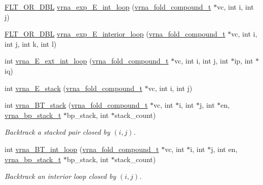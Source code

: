 \begin{DoxyCompactItemize}
\mbox{\hyperlink{group__data__structures_ga31125aeace516926bf7f251f759b6126}{F\+L\+T\+\_\+\+O\+R\+\_\+\+D\+BL}} \mbox{\hyperlink{group__loops_ga516749f1374dccb079ea75c9711c31e6}{vrna\+\_\+exp\+\_\+\+E\+\_\+int\+\_\+loop}} (\mbox{\hyperlink{group__fold__compound_ga1b0cef17fd40466cef5968eaeeff6166}{vrna\+\_\+fold\+\_\+compound\+\_\+t}} $\ast$vc, int i, int j)
\item 
\mbox{\hyperlink{group__data__structures_ga31125aeace516926bf7f251f759b6126}{F\+L\+T\+\_\+\+O\+R\+\_\+\+D\+BL}} \mbox{\hyperlink{group__loops_gae27361b54e40da510011988326fcdfe1}{vrna\+\_\+exp\+\_\+\+E\+\_\+interior\+\_\+loop}} (\mbox{\hyperlink{group__fold__compound_ga1b0cef17fd40466cef5968eaeeff6166}{vrna\+\_\+fold\+\_\+compound\+\_\+t}} $\ast$vc, int i, int j, int k, int l)
\item 
int \mbox{\hyperlink{group__loops_ga821f83d41e68dd5e8e3c182c989b1fbf}{vrna\+\_\+\+E\+\_\+ext\+\_\+int\+\_\+loop}} (\mbox{\hyperlink{group__fold__compound_ga1b0cef17fd40466cef5968eaeeff6166}{vrna\+\_\+fold\+\_\+compound\+\_\+t}} $\ast$vc, int i, int j, int $\ast$ip, int $\ast$iq)
\item 
int \mbox{\hyperlink{group__loops_gac1e873bc12317fa9318a8185018a6f60}{vrna\+\_\+\+E\+\_\+stack}} (\mbox{\hyperlink{group__fold__compound_ga1b0cef17fd40466cef5968eaeeff6166}{vrna\+\_\+fold\+\_\+compound\+\_\+t}} $\ast$vc, int i, int j)
\item 
int \mbox{\hyperlink{group__loops_gad320d5d721e33bed120168213d8f45e5}{vrna\+\_\+\+B\+T\+\_\+stack}} (\mbox{\hyperlink{group__fold__compound_ga1b0cef17fd40466cef5968eaeeff6166}{vrna\+\_\+fold\+\_\+compound\+\_\+t}} $\ast$vc, int $\ast$i, int $\ast$j, int $\ast$en, \mbox{\hyperlink{group__data__structures_gaa651bda42e7692f08cb603cd6834b0ee}{vrna\+\_\+bp\+\_\+stack\+\_\+t}} $\ast$bp\+\_\+stack, int $\ast$stack\+\_\+count)
\begin{DoxyCompactList}\small\item\em Backtrack a stacked pair closed by $ (i,j) $. \end{DoxyCompactList}\item 
int \mbox{\hyperlink{group__loops_ga849b7dc373b6c0b029672e16a7e52053}{vrna\+\_\+\+B\+T\+\_\+int\+\_\+loop}} (\mbox{\hyperlink{group__fold__compound_ga1b0cef17fd40466cef5968eaeeff6166}{vrna\+\_\+fold\+\_\+compound\+\_\+t}} $\ast$vc, int $\ast$i, int $\ast$j, int en, \mbox{\hyperlink{group__data__structures_gaa651bda42e7692f08cb603cd6834b0ee}{vrna\+\_\+bp\+\_\+stack\+\_\+t}} $\ast$bp\+\_\+stack, int $\ast$stack\+\_\+count)
\begin{DoxyCompactList}\small\item\em Backtrack an interior loop closed by $ (i,j) $. \end{DoxyCompactList}\item 

\end{DoxyCompactItemize}
